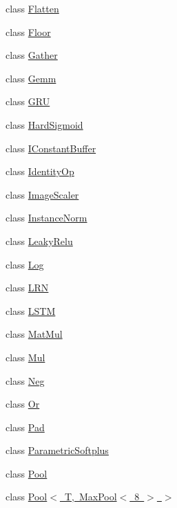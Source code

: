 \begin{DoxyCompactItemize}
\item 
class \mbox{\hyperlink{classonnxruntime_1_1cuda_1_1Flatten}{Flatten}}
\item 
class \mbox{\hyperlink{classonnxruntime_1_1cuda_1_1Floor}{Floor}}
\item 
class \mbox{\hyperlink{classonnxruntime_1_1cuda_1_1Gather}{Gather}}
\item 
class \mbox{\hyperlink{classonnxruntime_1_1cuda_1_1Gemm}{Gemm}}
\item 
class \mbox{\hyperlink{classonnxruntime_1_1cuda_1_1GRU}{G\+RU}}
\item 
class \mbox{\hyperlink{classonnxruntime_1_1cuda_1_1HardSigmoid}{Hard\+Sigmoid}}
\item 
class \mbox{\hyperlink{classonnxruntime_1_1cuda_1_1IConstantBuffer}{I\+Constant\+Buffer}}
\item 
class \mbox{\hyperlink{classonnxruntime_1_1cuda_1_1IdentityOp}{Identity\+Op}}
\item 
class \mbox{\hyperlink{classonnxruntime_1_1cuda_1_1ImageScaler}{Image\+Scaler}}
\item 
class \mbox{\hyperlink{classonnxruntime_1_1cuda_1_1InstanceNorm}{Instance\+Norm}}
\item 
class \mbox{\hyperlink{classonnxruntime_1_1cuda_1_1LeakyRelu}{Leaky\+Relu}}
\item 
class \mbox{\hyperlink{classonnxruntime_1_1cuda_1_1Log}{Log}}
\item 
class \mbox{\hyperlink{classonnxruntime_1_1cuda_1_1LRN}{L\+RN}}
\item 
class \mbox{\hyperlink{classonnxruntime_1_1cuda_1_1LSTM}{L\+S\+TM}}
\item 
class \mbox{\hyperlink{classonnxruntime_1_1cuda_1_1MatMul}{Mat\+Mul}}
\item 
class \mbox{\hyperlink{classonnxruntime_1_1cuda_1_1Mul}{Mul}}
\item 
class \mbox{\hyperlink{classonnxruntime_1_1cuda_1_1Neg}{Neg}}
\item 
class \mbox{\hyperlink{classonnxruntime_1_1cuda_1_1Or}{Or}}
\item 
class \mbox{\hyperlink{classonnxruntime_1_1cuda_1_1Pad}{Pad}}
\item 
class \mbox{\hyperlink{classonnxruntime_1_1cuda_1_1ParametricSoftplus}{Parametric\+Softplus}}
\item 
class \mbox{\hyperlink{classonnxruntime_1_1cuda_1_1Pool}{Pool}}
\item 
class \mbox{\hyperlink{classonnxruntime_1_1cuda_1_1Pool_3_01T_00_01MaxPool_3_018_01_4_01_4}{Pool$<$ T, Max\+Pool$<$ 8 $>$ $>$}}

\end{DoxyCompactItemize}
